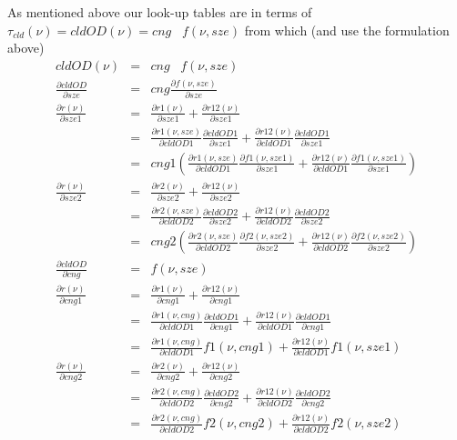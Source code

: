 \documentclass[11pt]{article}
\begin{document}
As mentioned above our look-up tables are in terms of $\tau_{cld}(\nu) = cldOD(\nu) = cng \;\;\; f(\nu,sze)$ from which (and use the formulation above)
\[
\begin{array}{ccc}
\hline
cldOD(\nu) & = & cng \;\;\; f(\nu,sze) \\
\hline
\frac{\partial cldOD}{\partial sze} & = & cng \frac{\partial f(\nu,sze)}{\partial sze} \\
\frac{\partial r(\nu)}{\partial sze1} & = & \frac{\partial r1(\nu)}{\partial sze1} + \frac{\partial r12(\nu)}{\partial sze1} \\
                                      & = & \frac{\partial r1(\nu,sze)}{\partial cldOD1} \frac{\partial cldOD1}{\partial sze1} + \frac{\partial r12(\nu)} {\partial cldOD1} \frac{\partial cldOD1}{\partial sze1} \\
                                      & = & cng1 \left(\frac{\partial r1(\nu,sze)}{\partial cldOD1} \frac{\partial f1(\nu,sze1)}{\partial sze1} + \frac{\partial r12(\nu)} {\partial cldOD1} \frac{\partial f1(\nu,sze1)}{\partial sze1} \right) \\
\frac{\partial r(\nu)}{\partial sze2} & = & \frac{\partial r2(\nu)}{\partial sze2} + \frac{\partial r12(\nu)}{\partial sze2} \\
                                      & = & \frac{\partial r2(\nu,sze)}{\partial cldOD2} \frac{\partial cldOD2}{\partial sze2} + \frac{\partial r12(\nu)} {\partial cldOD2} \frac{\partial cldOD2}{\partial sze2} \\
                                      & = & cng2 \left(\frac{\partial r2(\nu,sze)}{\partial cldOD2} \frac{\partial f2(\nu,sze2)}{\partial sze2} + \frac{\partial r12(\nu)} {\partial cldOD2} \frac{\partial f2(\nu,sze2)}{\partial sze2} \right) \\
\hline
\frac{\partial cldOD}{\partial cng} & = & f(\nu,sze) \\
\frac{\partial r(\nu)}{\partial cng1} & = & \frac{\partial r1(\nu)}{\partial cng1} + \frac{\partial r12(\nu)}{\partial cng1} \\
                                      & = & \frac{\partial r1(\nu,cng)}{\partial cldOD1} \frac{\partial cldOD1}{\partial cng1} + \frac{\partial r12(\nu)} {\partial cldOD1} \frac{\partial cldOD1}{\partial cng1} \\
                                      & = & \frac{\partial r1(\nu,cng)}{\partial cldOD1} f1(\nu,cng1) + \frac{\partial r12(\nu)} {\partial cldOD1} f1(\nu,sze1) \\
\frac{\partial r(\nu)}{\partial cng2} & = & \frac{\partial r2(\nu)}{\partial cng2} + \frac{\partial r12(\nu)}{\partial cng2} \\
                                      & = & \frac{\partial r2(\nu,cng)}{\partial cldOD2} \frac{\partial cldOD2}{\partial cng2} + \frac{\partial r12(\nu)} {\partial cldOD2} \frac{\partial cldOD2}{\partial cng2} \\
                                      & = & \frac{\partial r2(\nu,cng)}{\partial cldOD2} f2(\nu,cng2) + \frac{\partial r12(\nu)} {\partial cldOD2} f2(\nu,sze2) \\
\end{array}
\]
\end{document}
